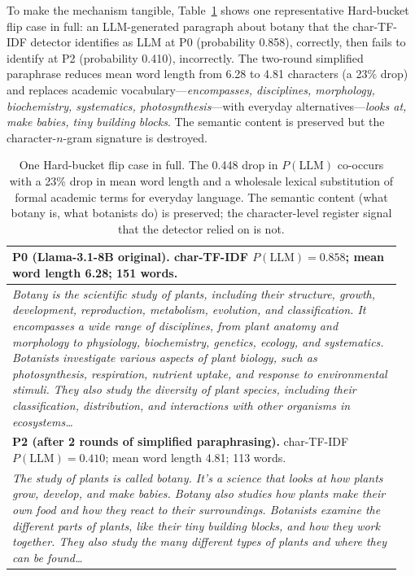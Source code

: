 \documentclass[11pt,a4paper]{article}
\begin{document}
To make the mechanism tangible, Table~\ref{tab:concrete_example} shows one
representative Hard-bucket flip case in full: an LLM-generated paragraph
about botany that the char-TF-IDF detector identifies as LLM at P0
(probability 0.858), correctly, then fails to identify at P2 (probability
0.410), incorrectly. The two-round simplified paraphrase reduces mean word
length from 6.28 to 4.81 characters (a 23\% drop) and replaces academic
vocabulary—\emph{encompasses, disciplines, morphology, biochemistry,
systematics, photosynthesis}—with everyday alternatives—\emph{looks at,
make babies, tiny building blocks}. The semantic content is preserved
but the character-$n$-gram signature is destroyed.

\begin{table}[H]
\centering
\small
\begin{tabular}{p{0.95\linewidth}}
\toprule
\textbf{P0 (Llama-3.1-8B original).} char-TF-IDF
$P(\mathrm{LLM})=\mathbf{0.858}$; mean word length 6.28; 151 words. \\
\midrule
\emph{Botany is the scientific study of plants, including their structure,
growth, development, reproduction, metabolism, evolution, and classification.
It encompasses a wide range of disciplines, from plant anatomy and morphology
to physiology, biochemistry, genetics, ecology, and systematics. Botanists
investigate various aspects of plant biology, such as photosynthesis,
respiration, nutrient uptake, and response to environmental stimuli. They
also study the diversity of plant species, including their classification,
distribution, and interactions with other organisms in ecosystems\ldots} \\
\midrule
\textbf{P2 (after 2 rounds of simplified paraphrasing).} char-TF-IDF
$P(\mathrm{LLM})=\mathbf{0.410}$; mean word length 4.81; 113 words. \\
\midrule
\emph{The study of plants is called botany. It's a science that looks at
how plants grow, develop, and make babies. Botany also studies how plants
make their own food and how they react to their surroundings. Botanists
examine the different parts of plants, like their tiny building blocks,
and how they work together. They also study the many different types of
plants and where they can be found\ldots} \\
\bottomrule
\end{tabular}
\caption{One Hard-bucket flip case in full. The 0.448 drop in
$P(\mathrm{LLM})$ co-occurs with a 23\% drop in mean word length and a
wholesale lexical substitution of formal academic terms for everyday
language. The semantic content (what botany is, what botanists do) is
preserved; the character-level register signal that the detector relied
on is not.}
\label{tab:concrete_example}
\end{table}
\end{document}
